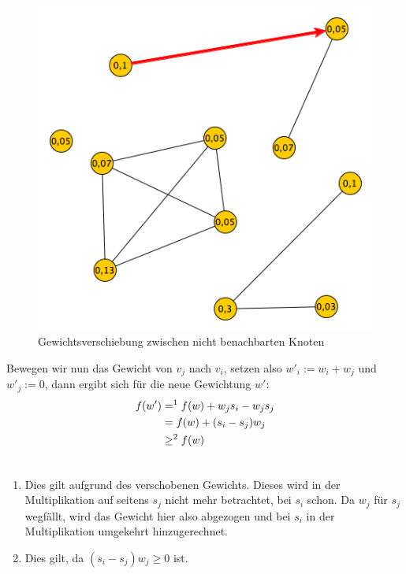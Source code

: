 \documentclass[12pt, a4paper]{article}
\begin{document}
\begin{figure}[H] 
		\centering
		\includegraphics[page=1, width=\textwidth]{assets/proof3_first_move}
		\caption{Gewichtsverschiebung zwischen nicht benachbarten Knoten} 
\end{figure}
\newpage

Bewegen wir nun das Gewicht von $v_j$ nach $v_i$, setzen also $w'_i := w_i + w_j$ und $w'_j := 0$, dann ergibt sich für die neue Gewichtung $w'$:
\begin{gather}
\begin{split}f(w') &=^1 f(w) + w_j s_i - w_j s_j \\
&= f(w) + (s_i - s_j) w_j \\
&\ge^2 f(w)\end{split}\notag\\\begin{split}\end{split}\notag
\end{gather}\begin{enumerate}
\item {}
Dies gilt aufgrund des verschobenen Gewichts. Dieses wird in der Multiplikation auf seitens $s_j$ nicht mehr betrachtet, bei $s_i$ schon. Da $w_j$ für $s_j$ wegfällt, wird das Gewicht hier also abgezogen und bei $s_i$ in der Multiplikation umgekehrt hinzugerechnet.

\item {}
Dies gilt, da $(s_i - s_j) w_j \ge 0$ ist.

\end{enumerate}
\end{document}
